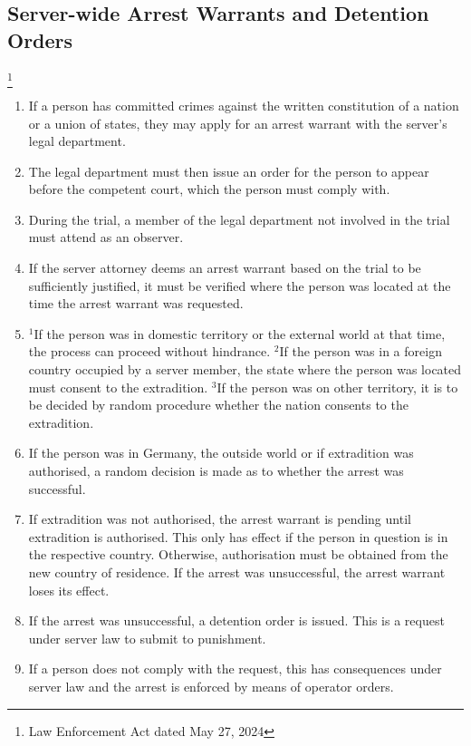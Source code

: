 \documentclass{article}
\begin{document}
\subsection{Server-wide Arrest Warrants and Detention Orders}\footnote{Law Enforcement Act dated May 27, 2024}
\begin{enumerate}[(1)]
    \item If a person has committed crimes against the written constitution of a nation or a union of states, they may apply for an arrest warrant with the server's legal department.
    \item The legal department must then issue an order for the person to appear before the competent court, which the person must comply with.
    \item During the trial, a member of the legal department not involved in the trial must attend as an observer.
    \item If the server attorney deems an arrest warrant based on the trial to be sufficiently justified, it must be verified where the person was located at the time the arrest warrant was requested.
	\item $^{1}$If the person was in domestic territory or the external world at that time, the process can proceed without hindrance. $^{2}$If the person was in a foreign country occupied by a server member, the state where the person was located must consent to the extradition. $^{3}$If the person was on other territory, it is to be decided by random procedure whether the nation consents to the extradition.
	\item If the person was in Germany, the outside world or if extradition was authorised, a random decision is made as to whether the arrest was successful.
	\item If extradition was not authorised, the arrest warrant is pending until extradition is authorised. This only has effect if the person in question is in the respective country. Otherwise, authorisation must be obtained from the new country of residence. If the arrest was unsuccessful, the arrest warrant loses its effect.
	\item If the arrest was unsuccessful, a detention order is issued. This is a request under server law to submit to punishment.
	\item If a person does not comply with the request, this has consequences under server law and the arrest is enforced by means of operator orders.
\end{enumerate}
\end{document}
